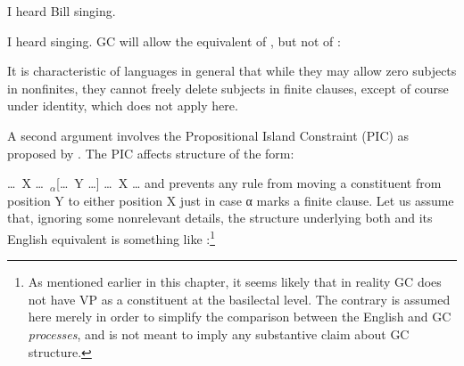 \ea\label{ex:2:136}I heard Bill singing.\z

\ea\label{ex:2:137}I heard singing.\z
GC will allow the equivalent of , but not of :

\z

\z
It is characteristic of languages in general that while they may allow zero subjects in nonfinites, they cannot freely delete subjects in finite clauses, except of course under identity, which does not apply here.

A second argument involves the Propositional Island Constraint (PIC) as proposed by \citet{Chomsky1977}. The PIC affects structure of the form:

\ea\label{ex:2:140}\ldots~X \ldots~$_{\alpha}$[\ldots~Y \ldots] \ldots~X \ldots \z
and prevents any rule from moving a constituent from position Y to either position X just in case α marks a finite clause. Let us assume that, ignoring some nonrelevant details, the structure underlying both  and its English equivalent is something like :\footnote{As mentioned earlier in this chapter, it seems likely that in reality GC does not have VP as a constituent at the basilectal level. The contrary is assumed here merely in order to simplify the comparison between the English and GC \textit{processes}, and is not meant to imply any substantive claim about GC structure.}

